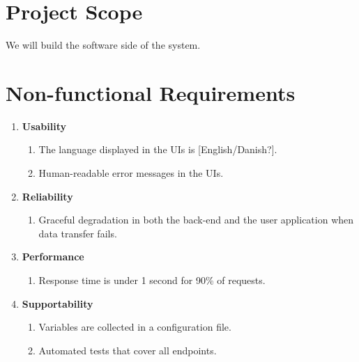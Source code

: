\documentclass[a4paper,11pt]{article}
\begin{document}
\section{Project Scope}
We will build the software side of the system.

\section{Non-functional Requirements}
\begin{enumerate}
    \item \textbf{Usability}
    \begin{enumerate}
        \item The language displayed in the UIs is [English/Danish?].
        \item Human-readable error messages in the UIs.
    \end{enumerate}

    \item \textbf{Reliability}
    \begin{enumerate}
        \item Graceful degradation in both the back-end and the user application when data transfer fails.
    \end{enumerate}

    \item \textbf{Performance}
    \begin{enumerate}
        \item Response time is under 1 second for 90\% of requests.
    \end{enumerate}

    \item \textbf{Supportability}
    \begin{enumerate}
        \item Variables are collected in a configuration file.
        \item Automated tests that cover all endpoints.
    \end{enumerate}
\end{enumerate}
\end{document}
